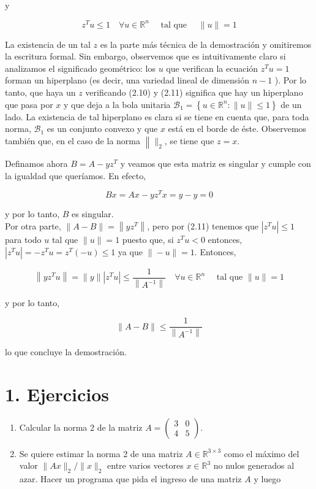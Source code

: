 \documentclass[10pt]{article}
\begin{document}
y


\begin{equation*}
z^{T} u \leq 1 \quad \forall u \in \mathbb{R}^{n} \quad \text { tal que } \quad\|u\|=1 \tag{2.11}
\end{equation*}


La existencia de un tal $z$ es la parte más técnica de la demostración y omitiremos la escritura formal. Sin embargo, observemos que es intuitivamente claro si analizamos el significado geométrico: los $u$ que verifican la ecuación $z^{T} u=1$ forman un hiperplano (es decir, una variedad lineal de dimensión $n-1$ ). Por lo tanto, que haya un $z$ verificando (2.10) y (2.11) significa que hay un hiperplano que pasa por $x$ y que deja a la bola unitaria $\mathcal{B}_{1}=\left\{u \in \mathbb{R}^{n}:\|u\| \leq 1\right\}$ de un lado. La existencia de tal hiperplano es clara si se tiene en cuenta que, para toda norma, $\mathcal{B}_{1}$ es un conjunto convexo y que $x$ está en el borde de éste. Observemos también que, en el caso de la norma $\left\|\|_{2}\right.$, se tiene que $z=x$.

Definamos ahora $B=A-y z^{T}$ y veamos que esta matriz es singular y cumple con la igualdad que queríamos. En efecto,

$$
B x=A x-y z^{T} x=y-y=0
$$

y por lo tanto, $B$ es singular.\\
Por otra parte, $\|A-B\|=\left\|y z^{T}\right\|$, pero por (2.11) tenemos que $\left|z^{T} u\right| \leq 1$ para todo $u$ tal que $\|u\|=1$ puesto que, si $z^{T} u<0$ entonces, $\left|z^{T} u\right|=-z^{T} u=z^{T}(-u) \leq 1$ ya que $\|-u\|=1$. Entonces,

$$
\left\|y z^{T} u\right\|=\|y\|\left|z^{T} u\right| \leq \frac{1}{\left\|A^{-1}\right\|} \quad \forall u \in \mathbb{R}^{n} \quad \text { tal que }\|u\|=1
$$

y por lo tanto,

$$
\|A-B\| \leq \frac{1}{\left\|A^{-1}\right\|}
$$

lo que concluye la demostración.

\section*{1. Ejercicios}
\begin{enumerate}
  \item Calcular la norma 2 de la matriz $A=\left(\begin{array}{ll}3 & 0 \\ 4 & 5\end{array}\right)$.
  \item Se quiere estimar la norma 2 de una matriz $A \in \mathbb{R}^{3 \times 3}$ como el máximo del valor $\|A x\|_{2} /\|x\|_{2}$ entre varios vectores $x \in \mathbb{R}^{3}$ no nulos generados al azar. Hacer un programa que pida el ingreso de una matriz $A$ y luego
\end{enumerate}
\end{document}
